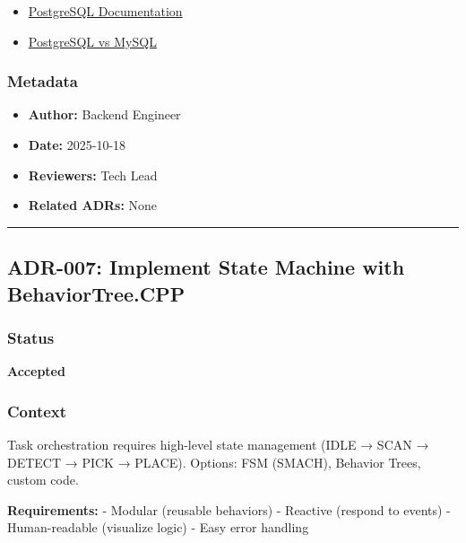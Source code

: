 \documentclass[
]{article}
\providecommand{\tightlist}{%
  \setlength{\itemsep}{0pt}\setlength{\parskip}{0pt}}
\begin{document}
\begin{itemize}
\tightlist
\item
  \href{https://www.postgresql.org/docs/15/}{PostgreSQL Documentation}
\item
  \href{https://www.2ndquadrant.com/en/postgresql/postgresql-vs-mysql/}{PostgreSQL
  vs MySQL}
\end{itemize}

\hypertarget{metadata-5}{%
\subsubsection{Metadata}\label{metadata-5}}

\begin{itemize}
\tightlist
\item
  \textbf{Author:} Backend Engineer
\item
  \textbf{Date:} 2025-10-18
\item
  \textbf{Reviewers:} Tech Lead
\item
  \textbf{Related ADRs:} None
\end{itemize}

\begin{center}\rule{0.5\linewidth}{0.5pt}\end{center}

\hypertarget{adr-007-implement-state-machine-with-behaviortree.cpp}{%
\subsection{ADR-007: Implement State Machine with
BehaviorTree.CPP}\label{adr-007-implement-state-machine-with-behaviortree.cpp}}

\hypertarget{status-6}{%
\subsubsection{Status}\label{status-6}}

\textbf{Accepted}

\hypertarget{context-6}{%
\subsubsection{Context}\label{context-6}}

Task orchestration requires high-level state management (IDLE → SCAN →
DETECT → PICK → PLACE). Options: FSM (SMACH), Behavior Trees, custom
code.

\textbf{Requirements:} - Modular (reusable behaviors) - Reactive
(respond to events) - Human-readable (visualize logic) - Easy error
handling
\end{document}
